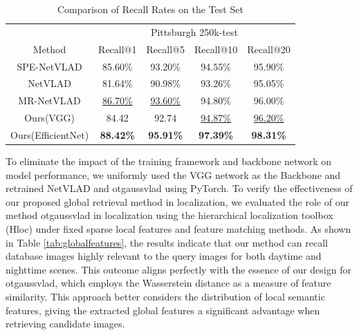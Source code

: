 \documentclass[journal]{IEEEtran}
\begin{document}
\begin{table}[tbp]
	\caption{Comparison of Recall Rates on the Test Set}
	\label{table:global}
	\setlength{\tabcolsep}{3.5pt}
	\centering
	\begin{tabular}{c|cccc}
		\hline
		& \multicolumn{4}{c}{\multirow{1.2}{*}{Pittsburgh 250k-test}}  \\
		\multirow{-2}{*}{Method} & Recall@1 & Recall@5 & Recall@10 &Recall@20\\ \hline
		
		SPE-NetVLAD \cite{ref14}      & 85.60\% & 93.20\% & 94.55\% & 95.90\%  \\
		NetVLAD \cite{ref7} & 81.64\% & 90.98\% & 93.26\% & 95.05\% \\
		MR-NetVLAD \cite{ref17}       &\underline{ 86.70\%} & \underline{93.60\%} & 94.80\% & 96.00\% \\ 
		Ours(VGG)      & 84.42 & 92.74 & \underline{94.87\%} &\underline{96.20\%}  \\
		Ours(EfficientNet)      & \textbf{88.42\%} & \textbf{95.91\%} & \textbf{97.39\%} & \textbf{98.31\%}  \\
		\hline
	\end{tabular}
\end{table}
To eliminate the impact of the training framework and backbone network on model performance, we uniformly used the VGG network as the Backbone and retrained NetVLAD and otgaussvlad using PyTorch. To verify the effectiveness of our proposed global retrieval method in localization, we evaluated the role of our method otgaussvlad in localization using the hierarchical localization toolbox (Hloc) under fixed sparse local features and feature matching methods. As shown in Table \ref{tab:globalfeatures}, the results indicate that our method can recall database images highly relevant to the query images for both daytime and nighttime scenes. This outcome aligns perfectly with the essence of our design for otgaussvlad, which employs the Wasserstein distance as a measure of feature similarity. This approach better considers the distribution of local semantic features, giving the extracted global features a significant advantage when retrieving candidate images.
\end{document}
